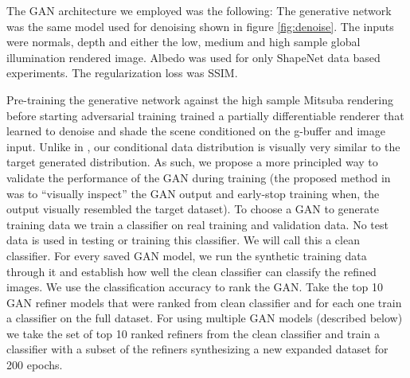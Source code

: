 \documentclass[10pt,twocolumn,letterpaper]{article}
\newcommand{\tompson}[1]{{\color{green} JT: #1}}
\begin{document}
The GAN architecture we employed was the following:  
The generative network was the same model used for denoising shown in figure \ref{fig:denoise}.  The inputs were normals, depth and either the low, medium and high sample global illumination rendered image. Albedo was used for only ShapeNet data based experiments. The regularization loss was SSIM.

Pre-training the generative network against the high sample Mitsuba rendering before starting adversarial training trained a partially differentiable renderer that learned to denoise and shade the scene conditioned on the g-buffer and image input. Unlike in \cite{DBLP:journals/corr/ShrivastavaPTSW16}, our conditional data distribution is visually very similar to the target generated distribution. As such, we propose a more principled way to validate the performance of the GAN during training (the proposed method in \cite{DBLP:journals/corr/ShrivastavaPTSW16} was to ``visually inspect'' the GAN output and early-stop training when, the output visually resembled the target dataset). To choose a GAN to generate training data we train a classifier on real training and validation data.  No test data is used in testing or training this classifier.  We will call this a clean classifier. For every saved GAN model, we run the synthetic training data through it and establish how well the clean classifier can classify the refined images. We use the classification accuracy to rank the GAN. Take the top 10 GAN refiner models that were ranked from clean classifier and for each one train a classifier on the full dataset. For using multiple GAN models (described below) we take the set of top 10 ranked refiners from the clean classifier and train a classifier with a subset of the refiners synthesizing a new expanded dataset for 200 epochs.
\end{document}
